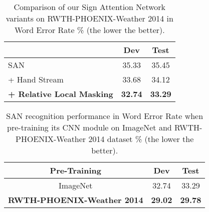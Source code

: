 \documentclass[a4paper,conference]{IEEEtran}
\begin{document}
\begin{table}[t!]
\begin{center}

\setlength{\tabcolsep}{10pt}

\caption{Comparison of our Sign Attention Network variants on RWTH-PHOENIX-Weather 2014 in Word Error Rate \% (the lower the better).}
\label{table:t2}
\begin{tabular}{l | c c}
& Dev & Test
\\

\hline

SAN & 35.33 & 35.45 \\

+ Hand Stream & 33.68 & 34.12 \\

\textbf{+ Relative Local Masking} & \textbf{32.74} & \textbf{33.29} \\

\hline
\end{tabular}
\end{center}
\vskip -0.2in \end{table}






\begin{table}[t!]
\begin{center}

\setlength{\tabcolsep}{10pt}

\caption{SAN recognition performance in Word Error Rate when pre-training its CNN module on ImageNet and RWTH-PHOENIX-Weather 2014 dataset \% (the lower the better).}
\label{table:t_pretraining}
\begin{tabular}{c | c c}
Pre-Training & Dev & Test
\\

\hline

ImageNet & 32.74 & 33.29 \\

\textbf{RWTH-PHOENIX-Weather 2014} & \textbf{29.02} & \textbf{29.78} \\

\hline
\end{tabular}
\end{center}
\vskip -0.2in \end{table}
\end{document}
